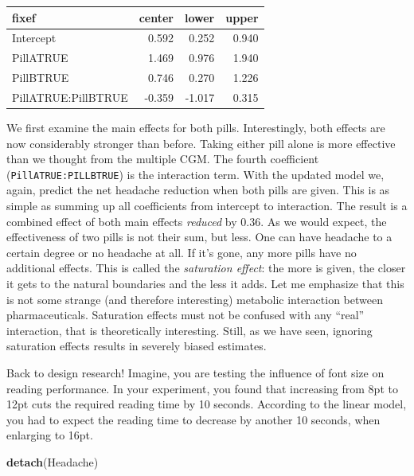 \documentclass[]{svmono}
\newenvironment{Shaded}{\begin{snugshade}}{\end{snugshade}}
\newcommand{\KeywordTok}[1]{\textcolor[rgb]{0.13,0.29,0.53}{\textbf{#1}}}
\newcommand{\NormalTok}[1]{#1}
\begin{document}
\begin{longtable}[]{@{}lrrr@{}}
\toprule
fixef & center & lower & upper\tabularnewline
\midrule
\endhead
Intercept & 0.592 & 0.252 & 0.940\tabularnewline
PillATRUE & 1.469 & 0.976 & 1.940\tabularnewline
PillBTRUE & 0.746 & 0.270 & 1.226\tabularnewline
PillATRUE:PillBTRUE & -0.359 & -1.017 & 0.315\tabularnewline
\bottomrule
\end{longtable}

We first examine the main effects for both pills. Interestingly, both
effects are now considerably stronger than before. Taking either pill
alone is more effective than we thought from the multiple CGM. The
fourth coefficient (\texttt{PillATRUE:PILLBTRUE}) is the interaction
term. With the updated model we, again, predict the net headache
reduction when both pills are given. This is as simple as summing up all
coefficients from intercept to interaction. The result is a combined
effect of both main effects \emph{reduced} by \(0.36\). As we would
expect, the effectiveness of two pills is not their sum, but less. One
can have headache to a certain degree or no headache at all. If it's
gone, any more pills have no additional effects. This is called the
\emph{saturation effect}: the more is given, the closer it gets to the
natural boundaries and the less it adds. Let me emphasize that this is
not some strange (and therefore interesting) metabolic interaction
between pharmaceuticals. Saturation effects must not be confused with
any ``real'' interaction, that is theoretically interesting. Still, as
we have seen, ignoring saturation effects results in severely biased
estimates.

Back to design research! Imagine, you are testing the influence of font
size on reading performance. In your experiment, you found that
increasing from 8pt to 12pt cuts the required reading time by 10
seconds. According to the linear model, you had to expect the reading
time to decrease by another 10 seconds, when enlarging to 16pt.

\begin{Shaded}
\begin{Highlighting}[]
\KeywordTok{detach}\NormalTok{(Headache)}
\end{Highlighting}
\end{Shaded}
\end{document}
